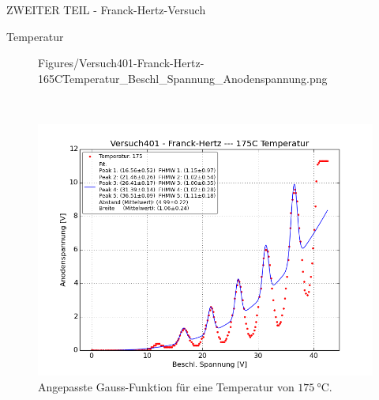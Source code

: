\begin{appendix}
\begin{chapter}{ZWEITER TEIL - Franck-Hertz-Versuch}
\begin{section}{Temperatur}
\begin{figure}[ht]
\begin{minipage}{0.48\textwidth}
              {Figures/Versuch401-Franck-Hertz-165CTemperatur_Beschl_Spannung_Anodenspannung.png}
          \caption{Angepasste Gauss-Funktion für eine Temperatur von 
              $\SI{165}{\celsius}$.}
          \label{fig:AnhangFHT165C}
        \end{minipage} \\
        \begin{minipage}{0.48\textwidth}
          \centering
          \includegraphics[width=\textwidth]
              {Figures/Versuch401-Franck-Hertz-175CTemperatur_Beschl_Spannung_Anodenspannung.png}
          \caption{Angepasste Gauss-Funktion für eine Temperatur von 
              $\SI{175}{\celsius}$.}
          \label{fig:AnhangFHT175C}
        \end{minipage}
      \end{figure}
      
    \end{section}
    
  \end{chapter}
  
\end{appendix}
 